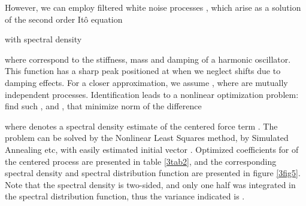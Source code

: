 \documentclass[preprint,12pt,authoryear]{elsarticle}
\begin{document}
However, we can employ filtered white noise processes , which arise as a solution of the second order It\^{o} equation

with spectral density

where  correspond to the stiffness, mass and damping of a harmonic oscillator. This function has a sharp peak positioned at  when we neglect shifts due to damping effects. For a closer approximation, we assume , where  are mutually independent  processes. Identification leads to a nonlinear optimization problem: find such ,  and , that minimize  norm  of the difference 

where  denotes a spectral density estimate of the centered force term . The problem can be solved by the Nonlinear Least Squares method, by Simulated Annealing etc, with easily estimated initial vector . Optimized coefficients for  of the centered process  are presented in table \ref{3tab2}, and the corresponding spectral density and spectral distribution function are presented in figure \ref{3fig5}. Note that the spectral density is two-sided, and only one half was integrated in the spectral distribution function, thus the variance indicated is .
\end{document}
